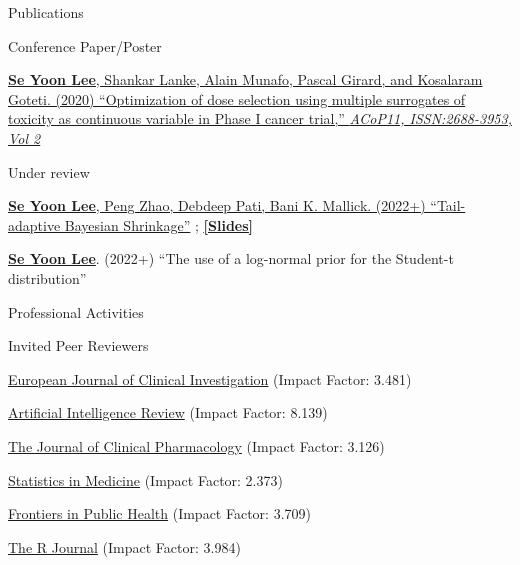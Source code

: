 \documentclass{resume} %
\begin{document}
\begin{rSection}{Publications}
\newpage

\begin{rSubsection}{Conference Paper/Poster}{}{}{}
\item[] [1] 
\href{https://github.com/yain22/2PLD/blob/main/Poster/ACOP_Se_Yoon_Lee_PhD.pdf}{\underline{\textbf{Se Yoon Lee}}, Shankar Lanke, Alain Munafo, Pascal Girard, and Kosalaram Goteti. (2020)
``Optimization of dose selection using multiple surrogates of toxicity as continuous variable in Phase I cancer trial,'' \textit{ACoP11, ISSN:2688-3953, Vol 2}}
\end{rSubsection}



\begin{rSubsection}{Under review}{}{}{}
\item[] [1]
\href{https://arxiv.org/abs/2007.02192}
{\underline{\textbf{Se Yoon Lee}}, Peng Zhao, Debdeep Pati, Bani K. Mallick. (2022+)
``Tail-adaptive Bayesian Shrinkage''}
;
\href{https://www.dropbox.com/s/5sx21h4guwl4dyz/Main_Doctoral_Dissertation_Work.pdf?dl=0}{\underline{\textbf{[Slides]}}}
\item[] [2]
\underline{\textbf{Se Yoon Lee}}. (2022+)
``The use of a log-normal prior for the Student-t distribution''
\end{rSubsection}
\end{rSection}


\begin{rSection}{Professional Activities}
\begin{rSubsection}{
Invited Peer Reviewers}{}{}{}
\item \href{https://onlinelibrary.wiley.com/journal/13652362}{European Journal of Clinical Investigation} (Impact Factor: 3.481)
\item \href{https://www.springer.com/journal/10462}{Artificial Intelligence Review} (Impact Factor: 8.139)
\item \href{https://accp1.onlinelibrary.wiley.com/journal/15524604}{The Journal of Clinical Pharmacology} (Impact Factor: 3.126)
\item \href{https://onlinelibrary.wiley.com/journal/10970258}{Statistics in Medicine} (Impact Factor: 2.373)
\item \href{https://www.frontiersin.org/journals/public-health}{Frontiers in Public Health} (Impact Factor: 3.709)
\item \href{https://journal.r-project.org/}{The R Journal} (Impact Factor: 3.984)
\end{rSubsection}
\end{rSection}
\end{document}
